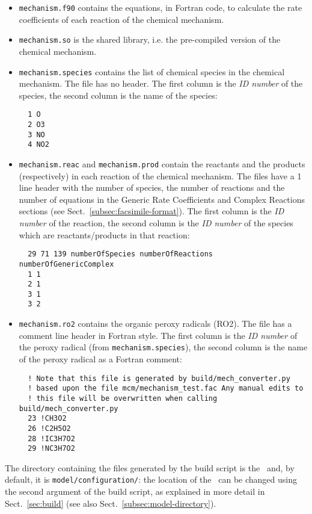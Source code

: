 \begin{itemize}
\item \texttt{mechanism.f90} contains the equations, in Fortran code,
  to calculate the rate coefficients of each reaction of the chemical
  mechanism.
\item \texttt{mechanism.so} is the shared library, i.e. the
  pre-compiled version of the chemical mechanism.
\item \texttt{mechanism.species} contains the list of chemical species
  in the chemical mechanism. The file has no header. The first column
  is the \emph{ID number} of the species, the second column is the
  name of the species:
  \begin{verbatim}
  1 O
  2 O3
  3 NO
  4 NO2
  \end{verbatim}
\item \texttt{mechanism.reac} and \texttt{mechanism.prod} contain the
  reactants and the products (respectively) in each reaction of the
  chemical mechanism. The files have a 1 line header with the number
  of species, the number of reactions and the number of equations in
  the Generic Rate Coefficients and Complex Reactions sections (see
  Sect.~\ref{subsec:facsimile-format}). The first column is the
  \emph{ID number} of the reaction, the second column is the \emph{ID
    number} of the species which are reactants/products in that
  reaction:
  \begin{verbatim}
  29 71 139 numberOfSpecies numberOfReactions numberOfGenericComplex
  1 1
  2 1
  3 1
  3 2
\end{verbatim}
\item \texttt{mechanism.ro2} contains the organic peroxy radicals
  (RO2). The file has a comment line header in Fortran style. The
  first column is the \emph{ID number} of the peroxy radical (from
  \texttt{mechanism.species}), the second column is the name of the
  peroxy radical as a Fortran comment:
  \begin{verbatim}
  ! Note that this file is generated by build/mech_converter.py
  ! based upon the file mcm/mechanism_test.fac Any manual edits to
  ! this file will be overwritten when calling build/mech_converter.py
  23 !CH3O2
  26 !C2H5O2
  28 !IC3H7O2
  29 !NC3H7O2
  \end{verbatim}
\end{itemize}

The directory containing the files generated by the build script is
the \sharedir\ and, by default, it is \texttt{model/configuration/}:
the location of the \sharedir\ can be changed using the second
argument of the build script, as explained in more detail in
Sect.~\ref{sec:build} (see also Sect.~\ref{subsec:model-directory}).

